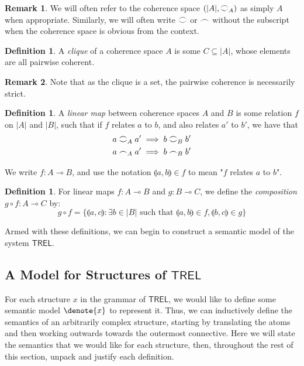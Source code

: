 \documentclass[11pt, oneside]{article}
\theoremstyle{plain}
\theoremstyle{definition}
\newtheorem{definition}[theorem]{Definition}
\newtheorem*{remark}{Remark}
\DeclarePairedDelimiter\denote\llbracket\rrbracket
\newcommand{\lp}{\llparenthesis}
\newcommand{\rp}{\rrparenthesis}
\newcommand{\sSys}{{\mathsf{TREL}}}%
\newcommand{\coh}[1][]{\mathrel{\vcenter{\offinterlineskip\hbox{$\frown$}\vskip0.2ex\hbox{$\smile$}}_{\ifx\\#1\\\else#1\fi}}}
\newcommand{\scoh}[1][]{\mathrel{\frown}_{\ifx\\#1\\\else#1\fi}}
\newcommand{\comp}{\mathbin{\circ}}
\begin{document}
\begin{remark}
    We will often refer to the coherence space $(|A|,\coh[A])$ as simply $A$ when appropriate.
    Similarly, we will often write $\coh$ or $\scoh$ without the subscript when the coherence space is obvious from the context.
\end{remark}

\begin{definition}
    A \textit{clique} of a coherence space $A$ is some $C \subseteq |A|$, whose elements are all pairwise coherent.
\end{definition}

\begin{remark}
    Note that as the clique is a set, the pairwise coherence is necessarily strict.
\end{remark}

\begin{definition}
    A \textit{linear map} between coherence spaces $A$ and $B$ is some relation $f$ on $|A|$ and $|B|$,
    such that if $f$ relates $a$ to $b$, and also relates $a'$ to $b'$, we have that
    \begin{align*}
        a \coh[A] a' &\implies b \coh[B] b' \\
        a \scoh[A] a' &\implies b \scoh[B] b'
    \end{align*}

    We write $f:A\multimap B$, and use the notation $\lp a,b\rp\in f$ to mean "$f$ relates $a$ to $b$".
\end{definition}

\begin{definition}
    For linear maps $f:A\multimap B$ and $g:B\multimap C$, we define the \textit{composition} $g\comp f:A\multimap C$ by:
    $$g\comp f = \{\lp a,c\rp:\exists b\in|B|\text{ such that }\lp a,b\rp\in f, \lp b,c\rp\in g\}$$
\end{definition}

Armed with these definitions, we can begin to construct a semantic model of the system $\sSys$.

\subsection{A Model for Structures of $\sSys$}

For each structure $x$ in the grammar of $\sSys$, we would like to define some semantic model $\denote{x}$ to represent it.
Thus, we can inductively define the semantics of an arbitrarily complex structure, starting by translating the atoms and then working outwards towards the outermost connective.
Here we will state the semantics that we would like for each structure, then, throughout the rest of this section, unpack and justify each definition.
\end{document}
